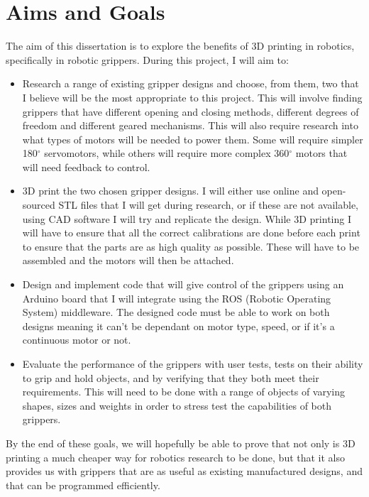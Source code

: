 \documentclass{l4proj}
\begin{document}
\section{Aims and Goals}
The aim of this dissertation is to explore the benefits of 3D printing in robotics, specifically in robotic grippers. During this project, I will aim to:

\begin{itemize}
  \item
  Research a range of existing gripper designs and choose, from them, two that I believe will be the most appropriate to this project. This will involve finding grippers that have different opening and closing methods, different degrees of freedom and different geared mechanisms. This will also require research into what types of motors will be needed to power them. Some will require simpler 180$^{\circ}$ servomotors, while others will require more complex 360$^{\circ}$ motors that will need feedback to control.
  \item
  3D print the two chosen gripper designs. I will either use online and open-sourced STL files that I will get during research, or if these are not available, using CAD software I will try and replicate the design. While 3D printing I will have to ensure that all the correct calibrations are done before each print to ensure that the parts are as high quality as possible. These will have to be assembled and the motors will then be attached.
  \item
  Design and implement code that will give control of the grippers using an Arduino board that I will integrate using the ROS (Robotic Operating System) middleware. The designed code must be able to work on both designs meaning it can't be dependant on motor type, speed, or if it's a continuous motor or not. 
  \item
  Evaluate the performance of the grippers with user tests, tests on their ability to grip and hold objects, and by verifying that they both meet their requirements. This will need to be done with a range of objects of varying shapes, sizes and weights in order to stress test the capabilities of both grippers. 
\end{itemize}

By the end of these goals, we will hopefully be able to prove that not only is 3D printing a much cheaper way for robotics research to be done, but that it also provides us with grippers that are as useful as existing manufactured designs, and that can be programmed efficiently.
\end{document}
